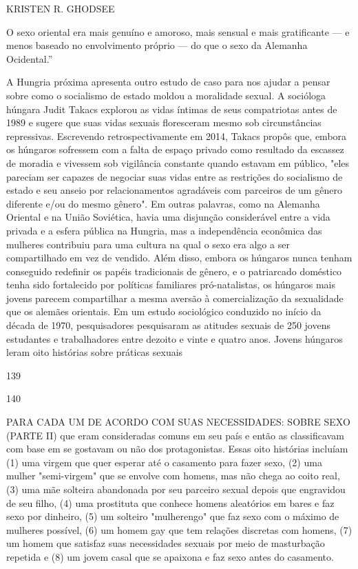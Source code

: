  \par 
KRISTEN R. GHODSEE
 \par 
O sexo oriental era mais genuíno e amoroso, mais sensual e mais gratificante — e menos baseado no envolvimento próprio — do que o sexo da Alemanha Ocidental.”
 \par 
A Hungria próxima apresenta outro estudo de caso para nos ajudar a pensar sobre como o socialismo de estado moldou a moralidade sexual. A socióloga húngara Judit Takacs explorou as vidas íntimas de seus compatriotas antes de 1989 e sugere que suas vidas sexuais floresceram mesmo sob circunstâncias repressivas. Escrevendo retrospectivamente em 2014, Takacs propôs que, embora os húngaros sofressem com a falta de espaço privado como resultado da escassez de moradia e vivessem sob vigilância constante quando estavam em público, "eles pareciam ser capazes de negociar suas vidas entre as restrições do socialismo de estado e seu anseio por relacionamentos agradáveis ​​com parceiros de um gênero diferente e/ou do mesmo gênero". Em outras palavras, como na Alemanha Oriental e na União Soviética, havia uma disjunção considerável entre a vida privada e a esfera pública na Hungria, mas a independência econômica das mulheres contribuiu para uma cultura na qual o sexo era algo a ser compartilhado em vez de vendido. Além disso, embora os húngaros nunca tenham conseguido redefinir os papéis tradicionais de gênero, e o patriarcado doméstico tenha sido fortalecido por políticas familiares pró-natalistas, os húngaros mais jovens parecem compartilhar a mesma aversão à comercialização da sexualidade que os alemães orientais. Em um estudo sociológico conduzido no início da década de 1970, pesquisadores pesquisaram as atitudes sexuais de {\color{blue}250} jovens estudantes e trabalhadores entre dezoito e vinte e quatro anos. Jovens húngaros leram oito histórias sobre práticas sexuais
 \par 
139
 \par 
140
 \par 
PARA CADA UM DE ACORDO COM SUAS NECESSIDADES: SOBRE SEXO (PARTE II) que eram consideradas comuns em seu país e então as classificavam com base em se gostavam ou não dos protagonistas. Essas oito histórias incluíam (1) uma virgem que quer esperar até o casamento para fazer sexo, (2) uma mulher "semi-virgem" que se envolve com homens, mas não chega ao coito real, (3) uma mãe solteira abandonada por seu parceiro sexual depois que engravidou de seu filho, (4) uma prostituta que conhece homens aleatórios em bares e faz sexo por dinheiro, (5) um solteiro "mulherengo" que faz sexo com o máximo de mulheres possível, (6) um homem gay que tem relações discretas com homens, (7) um homem que satisfaz suas necessidades sexuais por meio de masturbação repetida e (8) um ​​jovem casal que se apaixona e faz sexo antes do casamento.
